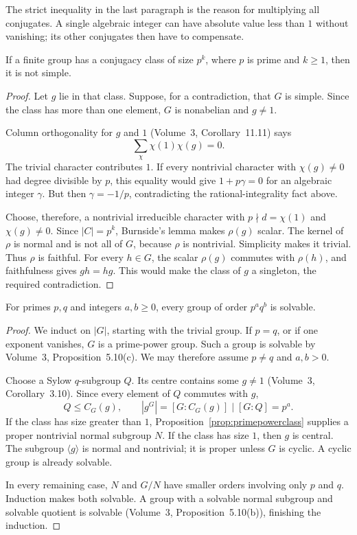 The strict inequality in the last paragraph is the reason for multiplying all conjugates. A single algebraic integer can have absolute value less than $1$ without vanishing; its other conjugates then have to compensate.

\begin{proposition}\label{prop:primepowerclass}
If a finite group has a conjugacy class of size $p^k$, where $p$ is prime and $k\ge1$, then it is not simple.
\end{proposition}

\begin{proof}
Let $g$ lie in that class. Suppose, for a contradiction, that $G$ is simple. Since the class has more than one element, $G$ is nonabelian and $g\ne1$.

Column orthogonality for $g$ and $1$ (Volume~3, Corollary~11.11) says
\[
\sum_\chi\chi(1)\chi(g)=0.
\]
The trivial character contributes $1$. If every nontrivial character with $\chi(g)\ne0$ had degree divisible by $p$, this equality would give $1+p\gamma=0$ for an algebraic integer $\gamma$. But then $\gamma=-1/p$, contradicting the rational-integrality fact above.

Choose, therefore, a nontrivial irreducible character with $p\nmid d=\chi(1)$ and $\chi(g)\ne0$. Since $|C|=p^k$, Burnside's lemma makes $\rho(g)$ scalar. The kernel of $\rho$ is normal and is not all of $G$, because $\rho$ is nontrivial. Simplicity makes it trivial. Thus $\rho$ is faithful. For every $h\in G$, the scalar $\rho(g)$ commutes with $\rho(h)$, and faithfulness gives $gh=hg$. This would make the class of $g$ a singleton, the required contradiction.
\end{proof}

\begin{theorem}[Burnside, 1904]\label{thm:burnsidepq}
For primes $p,q$ and integers $a,b\ge0$, every group of order $p^aq^b$ is solvable.
\end{theorem}

\begin{proof}
We induct on $|G|$, starting with the trivial group. If $p=q$, or if one exponent vanishes, $G$ is a prime-power group. Such a group is solvable by Volume~3, Proposition~5.10(c). We may therefore assume $p\ne q$ and $a,b>0$.

Choose a Sylow $q$-subgroup $Q$. Its centre contains some $g\ne1$ (Volume~3, Corollary~3.10). Since every element of $Q$ commutes with $g$,
\[
Q\le C_G(g),\qquad
|g^G|=[G:C_G(g)]\mid[G:Q]=p^a.
\]
If the class has size greater than $1$, Proposition~\ref{prop:primepowerclass} supplies a proper nontrivial normal subgroup $N$. If the class has size $1$, then $g$ is central. The subgroup $\langle g\rangle$ is normal and nontrivial; it is proper unless $G$ is cyclic. A cyclic group is already solvable.

In every remaining case, $N$ and $G/N$ have smaller orders involving only $p$ and $q$. Induction makes both solvable. A group with a solvable normal subgroup and solvable quotient is solvable (Volume~3, Proposition~5.10(b)), finishing the induction.
\end{proof}

